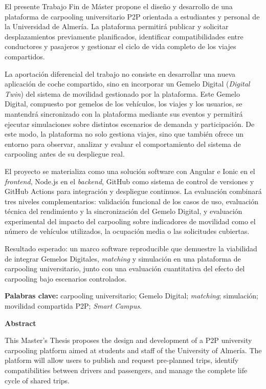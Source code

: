 El presente Trabajo Fin de Máster propone el diseño y desarrollo de una plataforma de carpooling universitario P2P orientada a estudiantes y personal de la Universidad de Almería. La plataforma permitirá publicar y solicitar desplazamientos previamente planificados, identificar compatibilidades entre conductores y pasajeros y gestionar el ciclo de vida completo de los viajes compartidos.

La aportación diferencial del trabajo no consiste en desarrollar una nueva aplicación de coche compartido, sino en incorporar un Gemelo Digital (\textit{Digital Twin}) del sistema de movilidad gestionado por la plataforma. Este Gemelo Digital, compuesto por gemelos de los vehículos, los viajes y los usuarios, se mantendrá sincronizado con la plataforma mediante sus eventos y permitirá ejecutar simulaciones sobre distintos escenarios de demanda y participación. De este modo, la plataforma no solo gestiona viajes, sino que también ofrece un entorno para observar, analizar y evaluar el comportamiento del sistema de carpooling antes de su despliegue real.

El proyecto se materializa como una solución software con Angular e Ionic en el \textit{frontend}, Node.js en el \textit{backend}, GitHub como sistema de control de versiones y GitHub Actions para integración y despliegue continuos. La evaluación combinará tres niveles complementarios: validación funcional de los casos de uso, evaluación técnica del rendimiento y la sincronización del Gemelo Digital, y evaluación experimental del impacto del carpooling sobre indicadores de movilidad como el número de vehículos utilizados, la ocupación media o las solicitudes cubiertas.

Resultado esperado: un marco software reproducible que demuestre la viabilidad de integrar Gemelos Digitales, \textit{matching} y simulación en una plataforma de carpooling universitario, junto con una evaluación cuantitativa del efecto del carpooling bajo escenarios controlados.

\textbf{Palabras clave:} carpooling universitario; Gemelo Digital; \textit{matching}; simulación; movilidad compartida P2P; \textit{Smart Campus}.

\vspace{0.5cm}

\textbf{Abstract}

This Master's Thesis proposes the design and development of a P2P university carpooling platform aimed at students and staff of the University of Almería. The platform will allow users to publish and request pre-planned trips, identify compatibilities between drivers and passengers, and manage the complete life cycle of shared trips.

